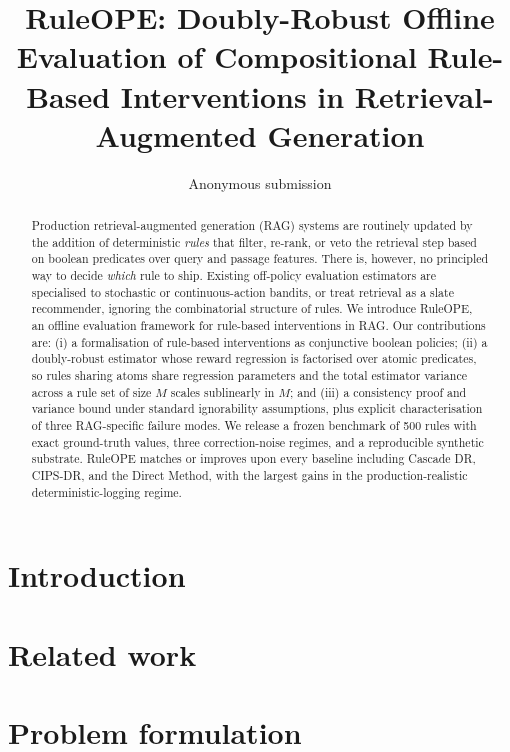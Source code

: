 \documentclass[11pt]{article}
\title{RuleOPE: Doubly-Robust Offline Evaluation of Compositional Rule-Based
Interventions in Retrieval-Augmented Generation}
\author{Anonymous submission}
\date{}
\begin{document}
\maketitle

\begin{abstract}
Production retrieval-augmented generation (RAG) systems are routinely updated
by the addition of deterministic \emph{rules} that filter, re-rank, or veto the
retrieval step based on boolean predicates over query and passage features.
There is, however, no principled way to decide \emph{which} rule to ship.
Existing off-policy evaluation estimators are specialised to stochastic or
continuous-action bandits, or treat retrieval as a slate recommender, ignoring
the combinatorial structure of rules.  We introduce RuleOPE, an offline
evaluation framework for rule-based interventions in RAG.  Our contributions
are: (i) a formalisation of rule-based interventions as conjunctive boolean
policies; (ii) a doubly-robust estimator whose reward regression is
factorised over atomic predicates, so rules sharing atoms share regression
parameters and the total estimator variance across a rule set of size $M$
scales sublinearly in $M$; and (iii) a consistency proof and variance bound
under standard ignorability assumptions, plus explicit characterisation of
three RAG-specific failure modes.  We release a frozen benchmark of 500
rules with exact ground-truth values, three correction-noise regimes, and a
reproducible synthetic substrate.  RuleOPE matches or improves upon every
baseline including Cascade DR, CIPS-DR, and the Direct Method, with the
largest gains in the production-realistic deterministic-logging regime.
\end{abstract}

\section{Introduction}
\label{sec:intro}


\section{Related work}
\label{sec:related}


\section{Problem formulation}
\label{sec:formulation}

\end{document}
